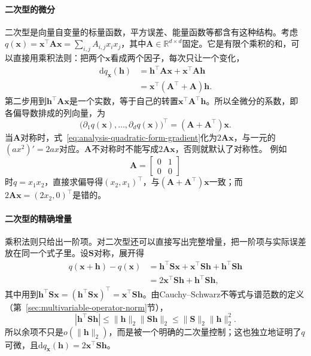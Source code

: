 \paragraph{二次型的微分}
二次型是向量自变量的标量函数，平方误差、能量函数等都含有这种结构。考虑$q(\bm{x})=\bm{x}^{\top}\bm{A}\bm{x}=\sum_{i,j}A_{i,j}x_ix_j$，其中$\bm{A}\in\mathbb{R}^{d\times d}$固定。它是有限个乘积的和，可以直接用乘积法则：把两个$\bm x$看成两个因子，每次只让一个变化，
\begin{align*}
  \mathrm{d}q_{\bm x}(\bm h)
  &=
  \bm h^{\top}\bm{A}\bm{x}
  +\bm{x}^{\top}\bm{A}\bm h\\
  &=
  \bm{x}^{\top}(\bm{A}^{\top}+\bm{A})\bm h.
\end{align*}
第二步用到$\bm h^\top\bm A\bm x$是一个实数，等于自己的转置$\bm x^\top\bm A^\top\bm h$。所以全微分的系数，即各偏导数排成的列向量，为
\begin{equation}
  \bigl(\partial_1q(\bm x),\ldots,\partial_dq(\bm x)\bigr)^\top
  =
  (\bm{A}+\bm{A}^{\top})\bm{x}.
\label{eq:analysis-quadratic-form-gradient}
\end{equation}
当$\bm{A}$对称时，式~\eqref{eq:analysis-quadratic-form-gradient}化为$2\bm{A}\bm{x}$，与一元的$(ax^2)'=2ax$对应。$\bm A$不对称时不能写成$2\bm{A}\bm{x}$，否则就默认了对称性。
例如
\[
 \bm A=\begin{bmatrix}0&1\\0&0\end{bmatrix}
\]
时$q=x_1x_2$，直接求偏导得$(x_2,x_1)^\top$，与$(\bm A+\bm A^\top)\bm x$一致；而$2\bm A\bm x=(2x_2,0)^\top$是错的。

\paragraph{二次型的精确增量}
乘积法则只给出一阶项。对二次型还可以直接写出完整增量，把一阶项与实际误差放在同一个式子里。设$\bm S$对称，展开得
\[
 \begin{aligned}
 q(\bm x+\bm h)-q(\bm x)
 &=\bm h^\top\bm S\bm x+\bm x^\top\bm S\bm h+\bm h^\top\bm S\bm h\\
 &=2\bm x^\top\bm S\bm h+\bm h^\top\bm S\bm h,
 \end{aligned}
\]
其中用到$\bm h^\top\bm S\bm x=(\bm h^\top\bm S\bm x)^\top=\bm x^\top\bm S\bm h$。由Cauchy--Schwarz不等式与谱范数的定义（第~\ref{sec:multivariable-operator-norm}节），
\[
 |\bm h^\top\bm S\bm h|\leq\lVert\bm h\rVert_2\lVert\bm S\bm h\rVert_2\leq\lVert\bm S\rVert_2\lVert\bm h\rVert_2^2 .
\]
所以余项不只是$o(\lVert\bm h\rVert_2)$，而是被一个明确的二次量控制；这也独立地证明了$q$可微，且$\mathrm dq_{\bm x}(\bm h)=2\bm x^\top\bm S\bm h$。


